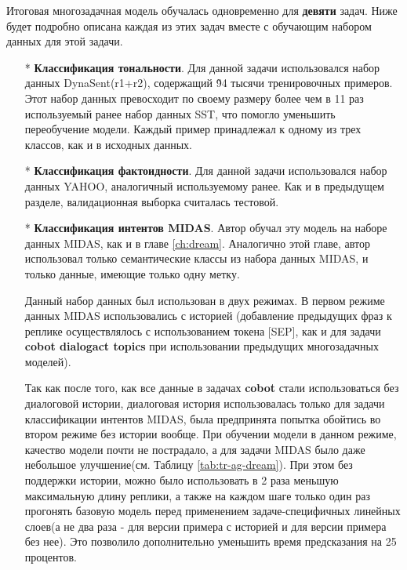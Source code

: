 Итоговая многозадачная модель обучалась одновременно для \textbf{девяти} задач. Ниже будет подробно описана каждая из этих задач вместе с обучающим набором данных для этой задачи. 
\begin{itemize} 
\item[*]\textbf{Классификация тональности}. Для данной задачи использовался набор данных DynaSent(r1+r2)\cite{dynasent}, содержащий \~ 94 тысячи тренировочных примеров. Этот набор данных превосходит по своему размеру более чем в 11 раз используемый ранее набор данных SST\cite{sst}, что помогло уменьшить переобучение модели. Каждый пример принадлежал к одному из трех классов, как и в исходных данных. 

\item[*]\textbf{Классификация фактоидности}. Для данной задачи использовался набор данных YAHOO\cite{yahoo}, аналогичный используемому ранее. Как и в предыдущем разделе, валидационная выборка считалась тестовой. 

\item[*]\textbf{Классификация интентов MIDAS}. Автор обучал эту модель на наборе данных MIDAS, как и в главе \ref{ch:dream}. Аналогично этой главе, автор использовал только семантические классы из набора данных MIDAS, и только данные, имеющие только одну метку. 

Данный набор данных был использован в двух режимах. В первом режиме данных MIDAS использовались с историей (добавление предыдущих фраз к реплике осуществлялось с использованием токена [SEP], как и для задачи \textbf{cobot dialogact topics} при использовании предыдущих многозадачных моделей).

Так как после того, как все данные в задачах \textbf{cobot} стали использоваться без диалоговой истории, диалоговая история использовалась только для задачи классификации интентов MIDAS, была предпринята попытка обойтись во втором режиме без истории вообще. При обучении модели в данном режиме, качество модели почти не пострадало, а для задачи MIDAS было даже небольшое улучшение(см. Таблицу \ref{tab:tr-ag-dream}). При этом без поддержки истории, можно было использовать в 2 раза меньшую максимальную длину реплики, а также на каждом шаге только один раз прогонять базовую модель перед применением задаче-специфичных линейных слоев(а не два раза - для версии примера с историей и для версии примера без нее). Это позволило дополнительно уменьшить время предсказания на 25 процентов. 


\end{itemize}
